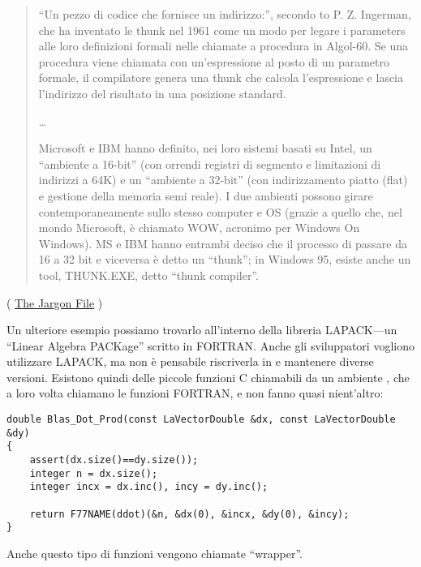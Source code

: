 \begin{framed}
\begin{quotation}
“Un pezzo di codice che fornisce un indirizzo:”, secondo to P. Z. Ingerman,
che ha inventato le thunk nel 1961 come un modo per legare i parameters alle loro definizioni formali
nelle chiamate a procedura in Algol-60. Se una procedura viene chiamata con un'espressione al posto di un parametro formale,
il compilatore genera una thunk che calcola l'espressione e lascia l'indirizzo del risultato in una posizione standard.

\dots

Microsoft e IBM hanno definito, nei loro sistemi basati su Intel, un “ambiente a 16-bit”
(con orrendi registri di segmento e limitazioni di indirizzi a 64K) e un “ambiente a 32-bit”
(con indirizzamento piatto (flat) e gestione della memoria semi reale). I due ambienti possono girare contemporaneamente
sullo stesso computer e OS (grazie a quello che, nel mondo Microsoft, è chiamato WOW, acronimo per Windows On Windows).
MS e IBM hanno entrambi deciso che il processo di passare da 16 a 32 bit e viceversa è detto un “thunk”; in Windows 95,
esiste anche un tool, THUNK.EXE, detto “thunk compiler”.
\end{quotation}
\end{framed}
( \href{http://www.catb.org/jargon/html/T/thunk.html}{The Jargon File} )

Un ulteriore esempio possiamo trovarlo all'interno della libreria LAPACK---un ``Linear Algebra PACKage'' scritto in FORTRAN.
Anche gli sviluppatori \CCpp vogliono utilizzare LAPACK, ma non è pensabile riscriverla in \CCpp e mantenere diverse versioni.
Esistono quindi delle piccole funzioni C chiamabili da un ambiente \CCpp, che a loro volta chiamano le funzioni FORTRAN,
e non fanno quasi nient'altro:

\begin{lstlisting}[style=customc]
double Blas_Dot_Prod(const LaVectorDouble &dx, const LaVectorDouble &dy)
{
    assert(dx.size()==dy.size());
    integer n = dx.size();
    integer incx = dx.inc(), incy = dy.inc();

    return F77NAME(ddot)(&n, &dx(0), &incx, &dy(0), &incy);
}
\end{lstlisting}

Anche questo tipo di funzioni vengono chiamate ``wrapper''.
